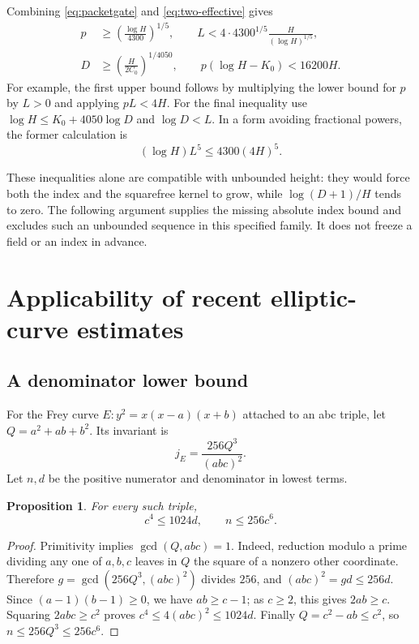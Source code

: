 \documentclass[11pt]{amsart}
\newtheorem{proposition}[theorem]{Proposition}
\theoremstyle{definition}
\theoremstyle{remark}
\begin{document}
Combining \eqref{eq:packetgate} and \eqref{eq:two-effective} gives
\begin{align}
 p&\ge\left(\frac{\log H}{4300}\right)^{1/5},\qquad
 L<4\cdot4300^{1/5}\frac{H}{(\log H)^{1/5}},\label{eq:uppercorr}\\
 D&\ge\left(\frac{H}{2C_0}\right)^{1/4050},\qquad
 p(\log H-K_0)<16200H.\label{eq:lowercorr}
\end{align}
For example, the first upper bound follows by multiplying the lower bound
for $p$ by $L>0$ and applying $pL<4H$.
For the final inequality use
$\log H\le K_0+4050\log D$ and $\log D<L$.
In a form avoiding fractional powers, the former calculation is
\[
 (\log H)L^5\le4300(4H)^5.
\]

These inequalities alone are compatible with unbounded height: they would
force both the index and the squarefree kernel to grow, while
$\log(D+1)/H$ tends to zero. The following argument supplies the missing
absolute index bound and excludes such an unbounded sequence in this
specified family. It does not freeze a field or an index in advance.





\section{Applicability of recent elliptic-curve estimates}\label{sec:frey}

\subsection{A denominator lower bound}
For the Frey curve $E:y^2=x(x-a)(x+b)$ attached to an abc triple, let
$Q=a^2+ab+b^2$. Its invariant is
\[
 j_E=\frac{256Q^3}{(abc)^2}.
\]
Let $n,d$ be the positive numerator and denominator in lowest terms.

\begin{proposition}\label{prop:denominator}
For every such triple,
\begin{equation}\label{eq:denominator}
 c^4\le1024d,\qquad n\le256c^6.
\end{equation}
\end{proposition}
\begin{proof}
Primitivity implies $\gcd(Q,abc)=1$. Indeed, reduction modulo a prime
dividing any one of $a,b,c$ leaves in $Q$ the square of a nonzero other
coordinate. Therefore $g=\gcd(256Q^3,(abc)^2)$ divides $256$, and
$(abc)^2=gd\le256d$.
Since $(a-1)(b-1)\ge0$, we have $ab\ge c-1$; as $c\ge2$, this gives
$2ab\ge c$. Squaring $2abc\ge c^2$ proves
$c^4\le4(abc)^2\le1024d$.
Finally $Q=c^2-ab\le c^2$, so $n\le256Q^3\le256c^6$.
\end{proof}
\end{document}

